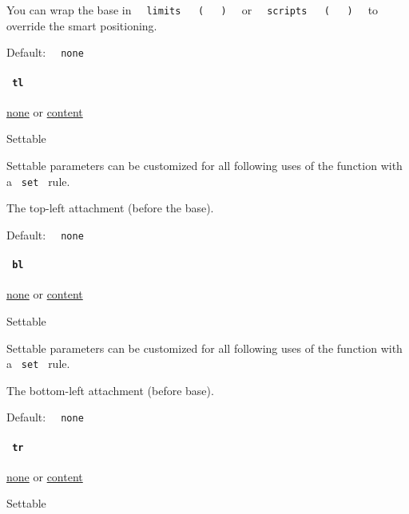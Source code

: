 You can wrap the base in
\texttt{\ }{\texttt{\ limits\ }}\texttt{\ }{\texttt{\ (\ }}\texttt{\ }{\texttt{\ )\ }}\texttt{\ }
or
\texttt{\ }{\texttt{\ scripts\ }}\texttt{\ }{\texttt{\ (\ }}\texttt{\ }{\texttt{\ )\ }}\texttt{\ }
to override the smart positioning.

Default: \texttt{\ }{\texttt{\ none\ }}\texttt{\ }

\paragraph{\texorpdfstring{\texttt{\ tl\ }}{ tl }}\label{functions-attach-tl}

\href{/docs/reference/foundations/none/}{none} {or}
\href{/docs/reference/foundations/content/}{content}

{{ Settable }}

\label{functions-attach-tl-settable-tooltip}
Settable parameters can be customized for all following uses of the
function with a \texttt{\ set\ } rule.

The top-left attachment (before the base).

Default: \texttt{\ }{\texttt{\ none\ }}\texttt{\ }

\paragraph{\texorpdfstring{\texttt{\ bl\ }}{ bl }}\label{functions-attach-bl}

\href{/docs/reference/foundations/none/}{none} {or}
\href{/docs/reference/foundations/content/}{content}

{{ Settable }}

\label{functions-attach-bl-settable-tooltip}
Settable parameters can be customized for all following uses of the
function with a \texttt{\ set\ } rule.

The bottom-left attachment (before base).

Default: \texttt{\ }{\texttt{\ none\ }}\texttt{\ }

\paragraph{\texorpdfstring{\texttt{\ tr\ }}{ tr }}\label{functions-attach-tr}

\href{/docs/reference/foundations/none/}{none} {or}
\href{/docs/reference/foundations/content/}{content}

{{ Settable }}

